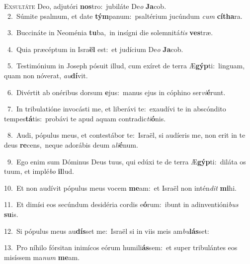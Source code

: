 \lettrine{\initial\textcolor{\initialcolor}{E}}{xsultáte} Deo, adjutóri \textbf{nos}\-tro:~\star jubiláte De\textit{o} \textbf{Ja}\-cob.\\
{\numbfont\textcolor{\numbcolor}{~2.}}~Súmite psalmum, et date \textbf{tým}\-panum:~\star psaltérium jucúndum \textit{cum} \textbf{cí}\-\textbf{tha}ra.\par
{\numbfont\textcolor{\numbcolor}{~3.}}~Buccináte in Neoménia \textbf{tu}\-ba,~\star in insígni die solemnitá\textit{tis} \textbf{ves}\-træ.\par
{\numbfont\textcolor{\numbcolor}{~4.}}~Quia præcéptum in Isra\textbf{ël} est:~\star et judícium De\textit{o} \textbf{Ja}\-cob.\par
{\numbfont\textcolor{\numbcolor}{~5.}}~Testimónium in Joseph pósuit illud, cum exíret de terra Æ\-\textbf{gýp}\-ti:~\star linguam, quam non nóverat, \textit{au}\-\textbf{dí}vit.\par
{\numbfont\textcolor{\numbcolor}{~6.}}~Divértit ab onéribus dorsum \textbf{e}\-jus:~\star manus ejus in cóphino ser\-\textit{vi}\-\textbf{é}runt.\par
{\numbfont\textcolor{\numbcolor}{~7.}}~In tribulatióne invocásti me, et liberávi te:~\dagger exaudívi te in abscóndito tempes\-\textbf{tá}\-tis:~\star probávi te apud aquam contradic\-\textit{ti}\-\textbf{ó}nis.\par
{\numbfont\textcolor{\numbcolor}{~8.}}~Audi, pópulus meus, et contestábor te:~\dagger Israël, si audíeris me, non erit in te deus \textbf{re}\-cens,~\star neque adorábis deum a\-\textit{li}\-\textbf{é}num.\par
{\numbfont\textcolor{\numbcolor}{~9.}}~Ego enim sum Dóminus Deus tuus, qui edúxi te de terra Æ\-\textbf{gýp}\-ti:~\star diláta os tuum, et implé\textit{bo} \textbf{il}\-lud.\par
{\numbfont\textcolor{\numbcolor}{10.}}~Et non audívit pópulus meus vocem \textbf{me}\-am:~\star et Israël non intén\textit{dit} \textbf{mi}\-hi.\par
{\numbfont\textcolor{\numbcolor}{11.}}~Et dimísi eos secúndum desidéria cordis e\-\textbf{ó}\-rum:~\star ibunt in adinventióni\textit{bus} \textbf{su}\-is.\par
{\numbfont\textcolor{\numbcolor}{12.}}~Si pópulus meus au\-\textbf{dís}\-set me:~\star Israël si in viis meis am\-\textit{bu}\-\textbf{lás}set:\par
{\numbfont\textcolor{\numbcolor}{13.}}~Pro níhilo fórsitan inimícos eórum humili\-\textbf{ás}\-sem:~\star et super tribulántes eos misíssem ma\textit{num} \textbf{me}\-am.\par

